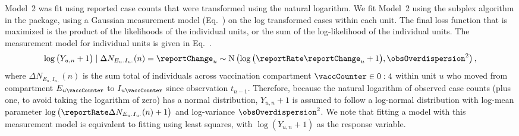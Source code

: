 Model~2 was fit using reported case counts that were transformed using the natural logarithm.
We fit Model~2 using the subplex algorithm in the  package, using
a Gaussian measurement model (Eq.~) on the log transformed cases within each unit.
The final loss function that is maximized is the product of the likelihoods of the individual units, or the sum of the log-likelihood of the individual units.
The measurement model for individual units is given in Eq.~.
\begin{equation}
  \label{model2:meas}
  \log\big(Y_{u, n} + 1\big) \mid \Delta N_{E_{u\cdot}I_{u\cdot}}(n) = \reportChange_u \sim \text{N}\left(\log \big(\reportRate \reportChange_u + 1\big), \obsOverdispersion^2 \right),
\end{equation}
where $\Delta N_{E_{u\cdot}I_{u\cdot}}(n)$ is the sum total of individuals across vaccination compartment $\vaccCounter \in 0:4$ within unit $u$ who moved from compartment $E_{u\vaccCounter}$ to $I_{u\vaccCounter}$ since observation $t_{n-1}$.
Therefore, because the natural logarithm of observed case counts (plus one, to avoid taking the logarithm of zero) has a normal distribution, $Y_{u, n} + 1$ is assumed to follow a log-normal distribution with log-mean parameter $\log\big(\reportRate \Delta N_{E_{u\cdot}I_{u\cdot}}(n) + 1\big)$ and log-variance $\obsOverdispersion^2$.
We note that fitting a model with this measurement model is equivalent to fitting using least squares, with $\log(Y_{u, n} + 1)$ as the response variable.

